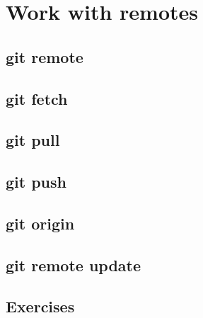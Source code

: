 \section{Work with remotes}
\begin{frame}[fragile]
    \slidetitle
\end{frame}

\subsection{git remote}
\begin{frame}[fragile]
    \subslidetitle
\end{frame}

\subsection{git fetch}
\begin{frame}[fragile]
    \subslidetitle
\end{frame}

\subsection{git pull}
\begin{frame}[fragile]
    \subslidetitle
\end{frame}

\subsection{git push}
\begin{frame}[fragile]
    \subslidetitle
\end{frame}

\subsection{git origin}
\begin{frame}[fragile]
    \subslidetitle
\end{frame}

\subsection{git remote update}
\begin{frame}[fragile]
    \subslidetitle
\end{frame}

\subsection{Exercises}
\begin{frame}[fragile]
  \subslidetitle
\end{frame}
